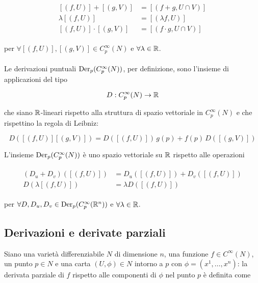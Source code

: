 \begin{align}
	\begin{split}
		[(f,U)] + [(g,V)] &= [(f+g , U \cap V)]\\
		\lambda [(f,U)] &= [(\lambda f,U)]\\
		[(f,U)] \cdot [(g,V)] &= [(f \cdot g , U \cap V)]
	\end{split}
\end{align}

per $ \forall [(f,U)], [(g,V)] \in C_{p}^{\infty}(N) $ e $ \forall \lambda \in \mathbb{R} $.\\\\
%
Le derivazioni puntuali $ \operatorname{Der}_{p}(C_{p}^{\infty}(N)) $, per definizione, sono l'insieme di applicazioni del tipo

\begin{equation}
	D : C_{p}^{\infty}(N) \to \mathbb{R}
\end{equation}

che siano $ \mathbb{R} $-lineari rispetto alla struttura di spazio vettoriale in $ C_{p}^{\infty}(N) $ e che rispettino la regola di Leibniz:

\begin{equation}
	D([(f,U)] [(g,V)]) = D([(f,U)]) \, g(p) + f(p) \, D([(g,V)])
\end{equation}

L'insieme $ \operatorname{Der}_{p}(C_{p}^{\infty}(N)) $ è uno spazio vettoriale su $ \mathbb{R} $ rispetto alle operazioni

\begin{align}
	\begin{split}
		(D_{u} + D_{v}) ([(f,U)]) &= D_{u}([(f,U)]) + D_{v}([(f,U)])\\
		D (\lambda [(f,U)]) &= \lambda D ([(f,U)])
	\end{split}
\end{align}

per $ \forall D,D_{u},D_{v} \in \operatorname{Der}_{p}(C_{p}^{\infty}(\mathbb{R}^{n})) $ e $ \forall \lambda \in \mathbb{R} $.

\subsection{Derivazioni e derivate parziali}

Siano una varietà differenziabile $ N $ di dimensione $ n $, una funzione $ f \in C^{\infty}(N) $, un punto $ p \in N $ e una carta $ (U, \phi) \in N $ intorno a $ p $ con $ \phi = (x^{1},\dots,x^{n}) $: la derivata parziale di $ f $ rispetto alle componenti di $ \phi $ nel punto $ p $ è definita come

